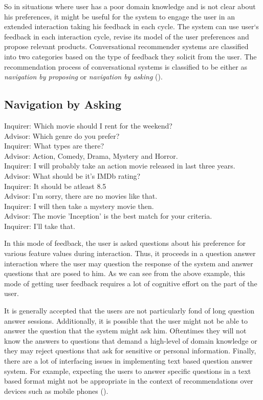 So in situations where user has a poor domain knowledge and is not clear about his preferences, it might be useful for the system to engage the user in an extended interaction taking his feedback in each cycle.
The system can use user`s feedback in each interaction cycle, revise its model of the user preferences and propose relevant products.
Conversational recommender systems are classified into two categories based on the type of feedback they solicit from the user.
The recommendation process of conversational systems is classified to be either as \textit{navigation by proposing} or \textit{navigation by asking} (\cite{shimazu01}).

\subsection{Navigation by Asking}
\begin{mdframed}
%
Inquirer:  Which movie should I rent for the weekend?\\
Advisor:   Which genre do you prefer? \\
Inquirer:  What types are there? \\
Advisor:   Action, Comedy, Drama, Mystery and Horror. \\
Inquirer:  I will probably take an action movie released in last three years. \\
Advisor:   What should be it's IMDb rating?\\
Inquirer:  It should be atleast 8.5 \\
Advisor: I'm sorry, there are no movies like that. \\
Inquirer:  I will then take a mystery movie then. \\
Advisor:  The movie 'Inception' is the best match for your criteria. \\
Inquirer:  I'll take that. \\
\end{mdframed}

In this mode of feedback, the user is asked questions about his preference for various feature values during interaction.
Thus, it proceeds in a question answer interaction where the user may question the response of the system and answer questions that are posed to him.
As we can see from the above example, this mode of getting user feedback requires a lot of cognitive effort on the part of the user.

It is generally accepted that the users are not particularly fond of long question answer sessions. 
Additionally, it is possible that the user might not be able to answer the question that the system might ask him. 
Oftentimes they will not know the answers to questions that demand a high-level of domain knowledge or they may reject questions that ask for sensitive or personal information.
Finally, there are a lot of interfacing issues in implementing text based question answer system. 
For example, expecting the users to answer specific questions in a text based format might not be appropriate in the context of recommendations over devices such as mobile phones (\cite{smyth2007}).





